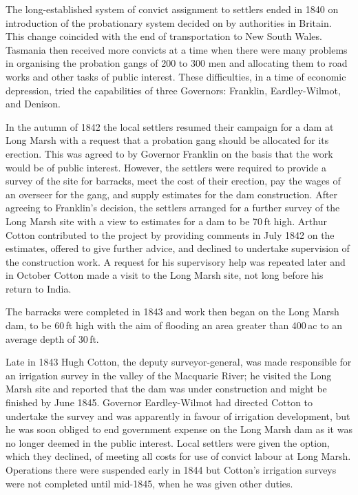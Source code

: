 The long-established system of convict assignment  to settlers ended in 1840 on introduction of the probationary
system decided on by authorities in Britain.  This change coincided
with the end of transportation to New South Wales.  Tasmania then
received more convicts at a time when there were many problems in
organising the probation gangs of 200 to 300 men and allocating them
to road works and other tasks of public interest.  These difficulties,
in a time of economic depression, tried the capabilities of three
Governors: Franklin, Eardley-Wilmot, and
Denison. 

In the autumn of 1842 the local settlers resumed their campaign for a
dam at Long Marsh with a request that a probation gang should be
allocated for its erection.  This was agreed to by Governor Franklin
on the basis that the work would be of public interest.  However, the
settlers were required to provide a survey of the site for barracks,
meet the cost of their erection, pay the wages of an overseer for the
gang, and supply estimates for the dam construction.  After agreeing
to Franklin's decision, the settlers arranged for a further survey of
the Long Marsh site with a view to estimates for a dam to be 70\,ft
high.  Arthur Cotton  contributed to the project by
providing comments in July 1842 on the estimates, offered to give
further advice, and declined to undertake supervision of the
construction work.  A request for his supervisory help was repeated
later and in October Cotton made a visit to the Long Marsh site, not
long before his return to India.

The barracks were completed in 1843 and work then began on the Long
Marsh dam, to be 60\,ft high with the aim of flooding an area greater
than 400\,ac to an average depth of
30\,ft.

Late in 1843 Hugh Cotton,  the deputy
surveyor-general, was made responsible for an irrigation survey in the
valley of the Macquarie River;  he visited the
Long Marsh  site and reported that the dam was under
construction and might be finished by June 1845.  Governor
Eardley-Wilmot  had directed Cotton to
undertake the survey and was apparently in favour of irrigation
development, but he was soon obliged to end government expense on the
Long Marsh dam as it was no longer deemed in the public interest.
Local settlers were given the option, which they declined, of meeting
all costs for use of convict labour  at Long
Marsh.  Operations there were suspended early in 1844 but Cotton's
irrigation surveys were not completed until mid-1845, when he was
given other duties.

